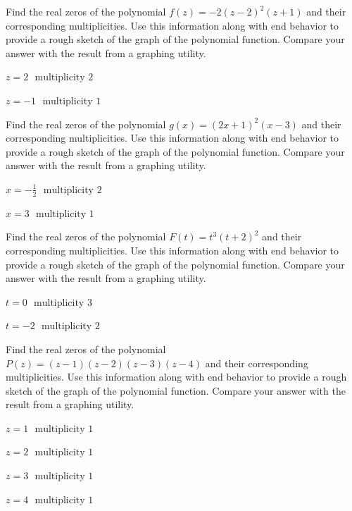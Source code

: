 \documentclass{ximera}
\begin{document}
\begin{problem}
Find the real zeros of the polynomial $f(z) = -2(z-2)^2(z+1)$ and their corresponding multiplicities.  Use this information along with end behavior to provide a rough sketch of the graph of the polynomial function.  Compare your answer with the result from a graphing utility.

\begin{solution}
$z = 2$
$\text{ multiplicity }  {2}$

$z = -1$
$\text{ multiplicity } {1}$

\end{solution}

\end{problem}

\begin{problem}
Find the real zeros of the polynomial $g(x) = (2x+1)^2(x-3)$ and their corresponding multiplicities.  Use this information along with end behavior to provide a rough sketch of the graph of the polynomial function.  Compare your answer with the result from a graphing utility.

\begin{solution}
$x = -\frac{1}{2}$
$\text{ multiplicity }  {2}$

$x = 3$
$\text{ multiplicity } {1}$

\end{solution}

\end{problem}


\begin{problem}
Find the real zeros of the polynomial $F(t) = t^{3}(t+ 2)^{2}$ and their corresponding multiplicities.  Use this information along with end behavior to provide a rough sketch of the graph of the polynomial function.  Compare your answer with the result from a graphing utility.

\begin{solution}
$t = 0$
$\text{ multiplicity }  {3}$

$t = -2$
$\text{ multiplicity } {2}$

\end{solution}

\end{problem}

\begin{problem}
Find the real zeros of the polynomial $P(z) = (z- 1)(z - 2)(z - 3)(z - 4)$ and their corresponding multiplicities.  Use this information along with end behavior to provide a rough sketch of the graph of the polynomial function.  Compare your answer with the result from a graphing utility.

\begin{solution}
$z = 1$
$\text{ multiplicity }  {1}$

$z = 2$
$\text{ multiplicity } {1}$

$z = 3$
$\text{ multiplicity }  {1}$

$z = 4$
$\text{ multiplicity } {1}$

\end{solution}

\end{problem}
\end{document}

